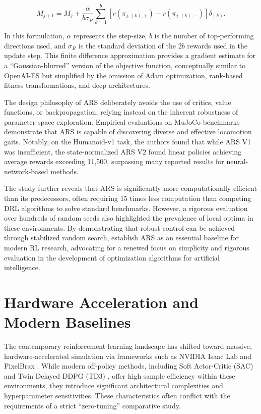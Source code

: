 \begin{equation}
M_{j+1} = M_j + \frac{\alpha}{b\sigma_R} \sum_{k=1}^b [r(\pi_{j,(k),+}) - r(\pi_{j,(k),-})] \delta_{(k)}.
\end{equation}

In this formulation, $\alpha$ represents the step-size, $b$ is the number of top-performing directions used, and $\sigma_R$ is the standard deviation of the $2b$ rewards used in the update step. This finite difference approximation provides a gradient estimate for a ``Gaussian-blurred'' version of the objective function, conceptually similar to OpenAI-ES but simplified by the omission of Adam optimization, rank-based fitness transformations, and deep architectures.

The design philosophy of ARS deliberately avoids the use of critics, value functions, or backpropagation, relying instead on the inherent robustness of parameter-space exploration. Empirical evaluations on MuJoCo benchmarks demonstrate that ARS is capable of discovering diverse and effective locomotion gaits. Notably, on the Humanoid-v1 task, the authors found that while ARS V1 was insufficient, the state-normalized ARS V2 found linear policies achieving average rewards exceeding 11{,}500, surpassing many reported results for neural-network-based methods.

The study further reveals that ARS is significantly more computationally efficient than its predecessors, often requiring 15 times less computation than competing DRL algorithms to solve standard benchmarks. However, a rigorous evaluation over hundreds of random seeds also highlighted the prevalence of local optima in these environments. By demonstrating that robust control can be achieved through stabilized random search, \citep{kolda2003directsearch} establish ARS as an essential baseline for modern RL research, advocating for a renewed focus on simplicity and rigorous evaluation in the development of optimization algorithms for artificial intelligence.
\section{Hardware Acceleration and Modern Baselines}

The contemporary reinforcement learning landscape has shifted toward massive, hardware-accelerated simulation via frameworks such as NVIDIA Isaac Lab \citep{nvidia2025isaac} and PixelBrax \citep{mcinroe2025pixelbrax}. While modern off-policy methods, including Soft Actor-Critic (SAC) \citep{haarnoja2018sac} and Twin Delayed DDPG (TD3) \citep{fujimoto2018td3}, offer high sample efficiency within these environments, they introduce significant architectural complexities and hyperparameter sensitivities. These characteristics often conflict with the requirements of a strict ``zero-tuning'' comparative study. 

